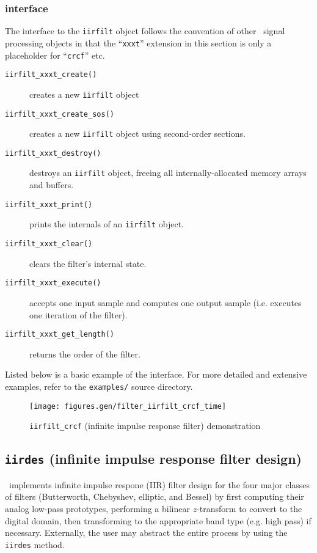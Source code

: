 \subsubsection{interface}
\label{module:filter:iirfilt:interface}
The interface to the {\tt iirfilt} object follows the convention of other
\liquid\ signal processing objects in that the ``{\tt xxxt}'' extension in
this section is only a placeholder for ``{\tt crcf}'' etc.

\begin{description}
\item[{\tt iirfilt\_xxxt\_create()}]
    creates a new {\tt iirfilt} object
\item[{\tt iirfilt\_xxxt\_create\_sos()}]
    creates a new {\tt iirfilt} object using second-order sections.
\item[{\tt iirfilt\_xxxt\_destroy()}]
    destroys an {\tt iirfilt} object, freeing all internally-allocated memory
    arrays and buffers.
\item[{\tt iirfilt\_xxxt\_print()}]
    prints the internals of an {\tt iirfilt} object.
\item[{\tt iirfilt\_xxxt\_clear()}]
    clears the filter's internal state.
\item[{\tt iirfilt\_xxxt\_execute()}]
    accepts one input sample and computes one output sample (i.e. executes one
    iteration of the filter).
\item[{\tt iirfilt\_xxxt\_get\_length()}]
    returns the order of the filter.
\end{description}

Listed below is a basic example of the interface.
For more detailed and extensive examples, refer to the {\tt examples/}
source directory.


\begin{figure}
\centering
  \texttt{[image: figures.gen/filter\_iirfilt\_crcf\_time]}
\caption{{\tt iirfilt\_crcf} (infinite impulse response filter) demonstration}
\label{fig:module:filter:iirfilt_crcf}
\end{figure}


\subsection{{\tt iirdes} (infinite impulse response filter design)}
\label{module:filter:iirdes}
\liquid\ implements infinite impulse respone (IIR) filter design for the four
major classes of filters (Butterworth, Chebyshev, elliptic, and Bessel) by
first computing their analog low-pass prototypes, performing a bilinear
$z$-transform to convert to the digital domain, then transforming to the
appropriate band type (e.g. high pass) if necessary.
Externally, the user may abstract the entire process by using the {\tt iirdes}
method.

